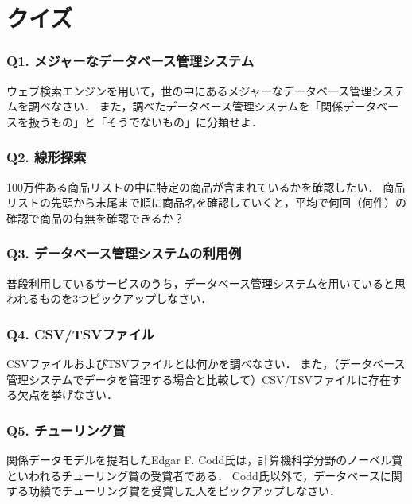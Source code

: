 \section{クイズ}
\subsubsection{Q1. メジャーなデータベース管理システム}
ウェブ検索エンジンを用いて，世の中にあるメジャーなデータベース管理システムを調べなさい．
また，調べたデータベース管理システムを「関係データベースを扱うもの」と「そうでないもの」に分類せよ．

\subsubsection{Q2. 線形探索}
100万件ある商品リストの中に特定の商品が含まれているかを確認したい．
商品リストの先頭から末尾まで順に商品名を確認していくと，平均で何回（何件）の確認で商品の有無を確認できるか？

\subsubsection{Q3. データベース管理システムの利用例}
普段利用しているサービスのうち，データベース管理システムを用いていると思われるものを3つピックアップしなさい．

\subsubsection{Q4. CSV/TSVファイル}
CSVファイルおよびTSVファイルとは何かを調べなさい．
また，（データベース管理システムでデータを管理する場合と比較して）CSV/TSVファイルに存在する欠点を挙げなさい．

\subsubsection{Q5. チューリング賞}
関係データモデルを提唱したEdgar F. Codd氏は，計算機科学分野のノーベル賞といわれるチューリング賞の受賞者である．
Codd氏以外で，データベースに関する功績でチューリング賞を受賞した人をピックアップしなさい．

